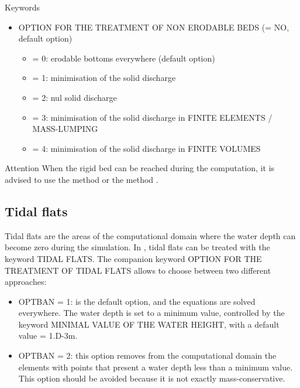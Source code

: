 \medskip
\begin{bclogo}[couleur=blue!10,arrondi=0.1, logo=\bcinfo]{Keywords}
\begin{itemize}
\item {\ttfamily OPTION FOR THE TREATMENT OF NON ERODABLE BEDS} ({\ttfamily = NO}, default option)
\begin{itemize}
\item {\ttfamily = 0}: erodable bottoms everywhere (default option)
\item {\ttfamily = 1}: minimisation of the solid discharge
\item {\ttfamily = 2}: nul solid discharge
\item {\ttfamily = 3}: minimisation of the solid discharge in {\ttfamily FINITE ELEMENTS / MASS-LUMPING}
\item {\ttfamily = 4}: minimisation of the solid discharge in {\ttfamily FINITE VOLUMES}
\end{itemize}
\end{itemize}
\end{bclogo}

\begin{bclogo}[couleur = blue!10, arrondi = 0.10, logo = \bcattention]{\textsf{Attention}}
When the rigid bed can be reached during the computation, it is advised
to use the method {} or the method {}.
\end{bclogo}

\subsection{Tidal flats}
Tidal flats are the areas of the computational domain where the water depth can become zero during the simulation. In \sisyphe, tidal flats can be treated with the keyword {\ttfamily TIDAL FLATS}. The companion keyword {\ttfamily OPTION FOR THE TREATMENT OF TIDAL FLATS} allows to choose between two different approaches:
\begin{itemize}
\item {\ttfamily OPTBAN = 1}: is the default option, and the equations are solved everywhere. The
water depth is set to a minimum value, controlled by the keyword {\ttfamily MINIMAL VALUE OF THE WATER HEIGHT}, with a default value {\ttfamily= 1.D-3}m. 
\item {\ttfamily OPTBAN = 2}: this option removes from the computational domain the elements with
points that present a water depth less than a minimum value. This option should be avoided because it is not exactly mass-conservative.
\end{itemize}


